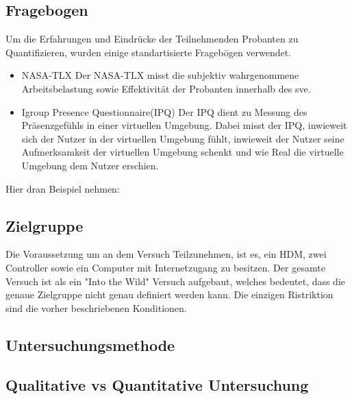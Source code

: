 \documentclass[a4paper,11pt]{article}%
\renewcommand{\\}{\vspace*{0.5\baselineskip} \newline}
\begin{document}
		\subsection{Fragebogen}
Um die Erfahrungen und Eindrücke der Teilnehmenden Probanten zu Quantifizieren, wurden einige standartisierte Fragebögen verwendet.
	
\begin{itemize}
\item{NASA-TLX} Der NASA-TLX misst die subjektiv wahrgenommene Arbeitsbelastung sowie Effektivität der Probanten innerhalb des \ac{sve}.
\item{Igroup Presence Questionnaire(IPQ)} Der IPQ dient zu Messung des Präsenzgefühls in einer virtuellen Umgebung. Dabei misst der IPQ, inwieweit sich der Nutzer in der virtuellen Umgebung fühlt, inwieweit der Nutzer seine Aufmerksamkeit der virtuellen Umgebung schenkt und wie Real die virtuelle Umgebung dem Nutzer erschien.
\end{itemize}
		Hier dran Beispiel nehmen:
		
		\subsection{Zielgruppe}
		Die Voraussetzung um an dem Versuch Teilzunehmen, ist es, ein \ac{HDM}, zwei Controller sowie ein Computer mit Internetzugang zu besitzen. Der gesamte Versuch ist als ein "Into the Wild" Versuch aufgebaut, welches bedeutet, dass die genaue Zielgruppe nicht genau definiert werden kann. Die einzigen Ristriktion sind die vorher beschriebenen Konditionen. 
		
		\subsection{Untersuchungsmethode}
			\subsection{Qualitative vs Quantitative Untersuchung}
\end{document}
